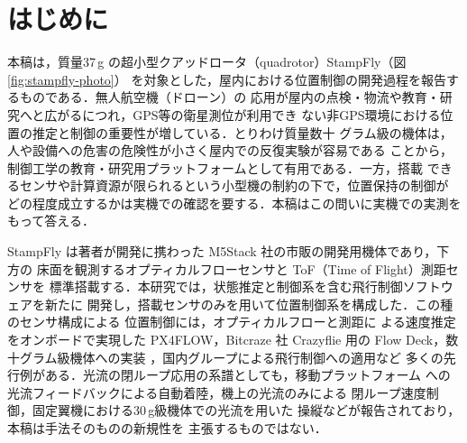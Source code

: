 \documentclass[a4paper,twocolumn,10pt]{ltjsarticle}
\begin{document}

\section{はじめに}
%
本稿は，質量37\,g
の超小型クアッドロータ（quadrotor）StampFly（図\ref{fig:stampfly-photo}）
を対象とした，屋内における位置制御の開発過程を報告するものである．無人航空機（ドローン）の
応用が屋内の点検・物流や教育・研究へと広がるにつれ，GPS等の衛星測位が利用でき
ない非GPS環境における位置の推定と制御の重要性が増している．とりわけ質量数十
グラム級の機体は，人や設備への危害の危険性が小さく屋内での反復実験が容易である
ことから，制御工学の教育・研究用プラットフォームとして有用である．一方，搭載
できるセンサや計算資源が限られるという小型機の制約の下で，位置保持の制御が
どの程度成立するかは実機での確認を要する．本稿はこの問いに実機での実測を
もって答える．

StampFly は著者が開発に携わった M5Stack 社の市販の開発用機体であり，下方の
床面を観測するオプティカルフローセンサと ToF（Time of Flight）測距センサを
標準搭載する．本研究では，状態推定と制御系を含む飛行制御ソフトウェアを新たに
開発し，搭載センサのみを用いて位置制御系を構成した．この種のセンサ構成による
位置制御には，オプティカルフローと測距に
よる速度推定をオンボードで実現した PX4FLOW\cite{honegger2013}，Bitcraze 社
Crazyflie 用の Flow Deck\cite{flowdeck}，数十グラム級機体への実装
\cite{mcguire2017}，国内グループによる飛行制御への適用\cite{kendoul2009}など
多くの先行例がある．光流の閉ループ応用の系譜としても，移動プラットフォーム
への光流フィードバックによる自動着陸\cite{herisse2012}，機上の光流のみによる
閉ループ速度制御\cite{grabe2012}，固定翼機における30\,g級機体での光流を用いた
操縦\cite{zufferey2005}などが報告されており，本稿は手法そのものの新規性を
主張するものではない．
\end{document}
